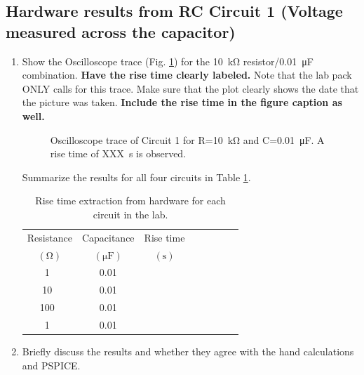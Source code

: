 \documentclass[11pt]{article}
\begin{document}
\subsection{Hardware results from RC Circuit 1 (Voltage measured across the capacitor)}
\label{Section:HardwareCircuit1}
\begin{enumerate}
	\item Show the Oscilloscope trace (Fig. \ref{fig:Circuit1Oscope}) for the 10~\si{\kilo\ohm} resistor/0.01~\si{\micro\farad} combination.  \textbf{Have the rise time clearly labeled.}  Note that the lab pack ONLY calls for this trace. Make sure that the plot clearly shows the date that the picture was taken. \textbf{Include the rise time in the figure caption as well.}
	\begin{figure}[h!]
		\vspace{2in}
		\caption{Oscilloscope trace of Circuit 1 for R=10~\si{\kilo\ohm} and C=0.01~\si{\micro\farad}.  A rise time of XXX~\si{\s} is observed.}
		\label{fig:Circuit1Oscope}
	\end{figure}
	Summarize the results for all four circuits in Table \ref{Table:RiseTimeTableCircuit1Hardware}.
	\begin{table}[h]
		\centering
		\caption{Rise time extraction from hardware for each circuit in the lab.}
		\label{Table:RiseTimeTableCircuit1Hardware}
		\begin{tabular}{|c |c|| c|| c | c | c| c|c |}\hline
			Resistance  & Capacitance &  Rise time    \\
			$\left(\si{\ohm}\right)$ 	  & $\left(\si{\micro\farad}\right)$	 & $\left(\si{\s}\right)$   \\
			
			\hline
			1~\si{\kilo}& 0.01&  \\
			\hline
			10~\si{\kilo}& 0.01&  \\
			\hline
			100~\si{\kilo}& 0.01&  \\
			\hline
			1~\si{\mega}& 0.01&  \\
			\hline
		\end{tabular}
	\end{table}
	\item Briefly discuss the results and whether they agree with the hand calculations and PSPICE.
\end{enumerate}
\end{document}
